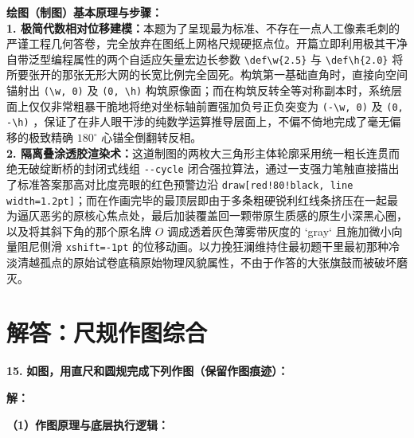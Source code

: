 \vspace{0.6cm}

{\small\color{blue!70!black}
\textbf{绘图（制图）基本原理与步骤：}\\
\textbf{1. 极简代数相对位移建模：}本题为了呈现最为标准、不存在一点人工像素毛刺的严谨工程几何答卷，完全放弃在图纸上网格尺规硬抠点位。开篇立即利用极其干净自带泛型编程属性的两个自适应矢量宏边长参数 \texttt{\textbackslash def\textbackslash w\{2.5\}} 与 \texttt{\textbackslash def\textbackslash h\{2.0\}} 将所要张开的那张无形大网的长宽比例完全固死。构筑第一基础直角时，直接向空间锚射出 \texttt{(\textbackslash w, 0)} 及 \texttt{(0, \textbackslash h)} 构筑原像面；而在构筑反转全等对称副本时，系统层面上仅仅非常粗暴干脆地将绝对坐标轴前置强加负号正负突变为 \texttt{(-\textbackslash w, 0)} 及 \texttt{(0, -\textbackslash h)} ，保证了在非人眼干涉的纯数学运算推导层面上，不偏不倚地完成了毫无偏移的极致精确 $180^\circ$ 心锚全倒翻转反相。\\
\textbf{2. 隔离叠涂透胶渲染术：}这道制图的两枚大三角形主体轮廓采用统一粗长连贯而绝无破绽断桥的封闭式线组 \texttt{-{}-cycle} 闭合强拉算法，通过一支强力笔触直接描出了标准答案那高对比度亮眼的红色预警边沿 \texttt{draw[red!80!black, line width=1.2pt]}；而在作画完毕的最顶层即由于多条粗硬锐利红线条挤压在一起最为逼仄恶劣的原核心焦点处，最后加装覆盖回一颗带原生质感的原生小深黑心圈，以及将其斜下角的那个原名牌 $O$ 调成透着灰色薄雾带灰度的 `gray` 且施加微小向量阻尼侧滑 \texttt{xshift=-1pt} 的位移动画。以力挽狂澜维持住最初题干里最初那种冷淡清越孤点的原始试卷底稿原始物理风貌属性，不由于作答的大张旗鼓而被破坏磨灭。
}

\newpage


\newpage

\section{解答：尺规作图综合}

\vspace{0.6cm}

\textbf{\LARGE 15.} \textbf{如图，用直尺和圆规完成下列作图（保留作图痕迹）：}

\vspace{0.4cm}

\textbf{解：}

\textbf{（1）作图原理与底层执行逻辑：}

